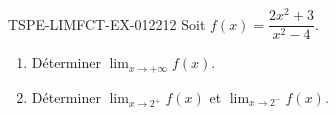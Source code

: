 \begin{exercice}{TSPE-LIMFCT-EX-012}{2}{12}
Soit $f(x) = \dfrac{2x^2 + 3}{x^2 - 4}$.
\begin{enumerate}
  \item Déterminer $\lim_{x \to +\infty} f(x)$.
  \item Déterminer $\lim_{x \to 2^+} f(x)$ et $\lim_{x \to 2^-} f(x)$.
\end{enumerate}
\end{exercice}
